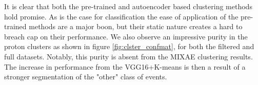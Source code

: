 It is clear that both the pre-trained and autoencoder based clustering methods hold promise. As is the case for classification the ease of application of the pre-trained methods are a major boon, but their static nature creates a hard to breach cap on their performance. We also observe an impressive purity in the proton clusters as shown in figure \ref{fig:clster_confmat}, for both the filtered and full datasets. Notably, this purity is absent from the MIXAE clustering results. The increase in performance from the VGG16+K-means is then a result of a stronger segmentation of the "other" class of events.

